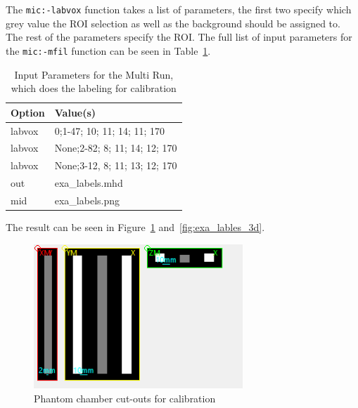 \documentclass[a4paper,12pt]{article}
\begin{document}
    \vspace{10pt}
    The \texttt{mic:-labvox} function takes a list of parameters, the first two specify which grey value the ROI selection as well as the background should be assigned to.
    The rest of the parameters specify the ROI.
    The full list of input parameters for the \texttt{mic:-mfil} function can be seen in Table~\ref{table:multi_run}.

    \begin{table}[h]
        \centering
        \begin{tabular}{|l|l|}
            \hline
            \textbf{Option} & \textbf{Value(s)}             \\
            \hline
            labvox          & 0;1-47; 10; 11; 14; 11; 170   \\
            \hline
            labvox          & None;2-82; 8; 11; 14; 12; 170 \\
            \hline
            labvox          & None;3-12, 8; 11; 13; 12; 170 \\
            \hline
            out             & exa\_labels.mhd               \\
            \hline
            mid             & exa\_labels.png               \\
            \hline
        \end{tabular}
        \caption{Input Parameters for the Multi Run, which does the labeling for calibration}
        \label{table:multi_run}
    \end{table}

    The result can be seen in Figure~\ref{fig:exa_lables} and~\ref{fig:exa_lables_3d}.

    \begin{figure}[htbp]
        \centering
        \includegraphics[width=0.7\textwidth]{exa_lables}
        \caption{Phantom chamber cut-outs for calibration}
        \label{fig:exa_lables}
    \end{figure}
\end{document}
